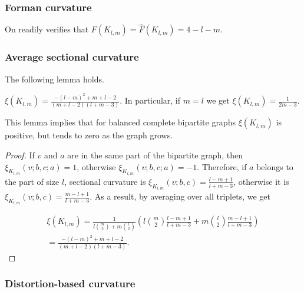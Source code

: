 \documentclass[runningheads]{llncs}
\newcommand{\ch}[1]{{\color{red} #1}}
\begin{document}
\subsubsection{Forman curvature} 
\ch{On readily verifies that}
$F(K_{l,m}) = \hat F(K_{l,m}) = 4 - l - m$. 


\subsubsection{Average sectional curvature} 
The following lemma holds.

\begin{lemma}\label{lem:bipartite_heuristic}
$
\xi({K_{l,m}}) = \frac{-(l - m)^2 + m + l - 2}{(m+l-2)(l+m-3)}.
$
In particular, if $m = l$ we get $\xi({K_{l,m}}) = \frac{1}{2m - 3}$. 
\end{lemma}
This lemma implies that for balanced complete bipartite graphs $\xi({K_{l,m}})$ is positive, but tends to zero as the graph grows.

\begin{proof}
If $v$ and $a$ are in the same part of the bipartite graph, then $\xi_{K_{l,m}}(v;b,c;a) = 1$, otherwise $\xi_{K_{l,m}}(v;b,c;a) = -1$. Therefore, if $a$ belongs to the part of size $l$, sectional curvature is
$\xi_{K_{l,m}}(v;b,c) = \frac{l-m+1}{l+m-3}$, otherwise it is $\xi_{K_{l,m}}(v;b,c) = \frac{m-l+1}{l+m-3}$. As a result, by averaging over all triplets, we get

\begin{multline*}
\xi({K_{l,m}}) = \frac{1}{l \binom{m}{2} + m \binom{l}{2}} \left(l \binom{m}{2} \frac{l-m+1}{l+m-3} + m \binom{l}{2} \frac{m-l+1}{l+m-3}\right) \\
= \frac{-(l - m)^2 + m + l - 2}{(m+l-2)(l+m-3)}.
\end{multline*}
\end{proof}



\subsubsection{Distortion-based curvature} 
\end{document}
